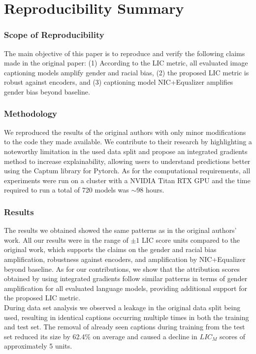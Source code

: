 \section*{\centering Reproducibility Summary}

\subsubsection*{Scope of Reproducibility}

The main objective of this paper is to reproduce and verify the following claims made in the original paper: (1) According to the LIC metric, all evaluated image captioning models amplify gender and racial bias, (2) the proposed LIC metric is robust against encoders, and (3) captioning model NIC+Equalizer amplifies gender bias beyond baseline.

\subsubsection*{Methodology}
We reproduced the results of the original authors with only minor modifications to the code they made available. We contribute to their research by highlighting a noteworthy limitation in the used data split and propose an integrated gradients method to increase explainability, allowing users to understand predictions better using the Captum library for Pytorch. As for the computational requirements, all experiments were run on a cluster with a NVIDIA Titan RTX GPU and the time required to run a total of 720 models 
was $\sim$98 hours.

\subsubsection*{Results}

The results we obtained showed the same patterns 
as in the original authors' work. All our results 
were in the range of $\pm1$ LIC score units compared to the original work, which supports the claims on the gender and racial bias amplification, robustness against encoders, and amplification by NIC+Equalizer beyond baseline. As for our contributions, we show that 
the attribution scores obtained by using integrated gradients follow similar 
patterns in terms of gender amplification for all evaluated language models, providing additional support for the proposed LIC metric.\\
During data set analysis we observed a
leakage in the original data split being used, resulting in identical captions occurring multiple times in both the training and test set. The removal of already seen captions during training
from the test set reduced its size by 62.4\% on average and caused a decline in $LIC_M$ scores of approximately 5 units.

